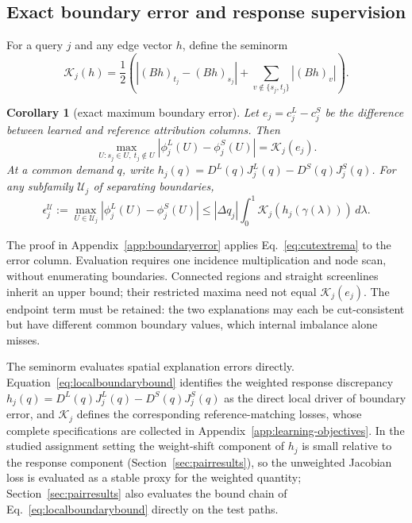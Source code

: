 \documentclass[a4paper,fleqn]{cas-sc}
\newtheorem{corollary}[theorem]{Corollary}
\begin{document}
\subsection{Exact boundary error and response supervision}\label{sec:boundarylearning}
For a query $j$ and any edge vector $h$, define the seminorm
\begin{equation}
\mathcal K_j(h)=\frac12\left(\left|(Bh)_{t_j}-(Bh)_{s_j}\right|
+\sum_{v\notin\{s_j,t_j\}}|(Bh)_v|\right).
\label{eq:boundaryseminorm}
\end{equation}
\begin{corollary}[exact maximum boundary error]\label{cor:boundaryerror}
Let $e_j=c^L_j-c^S_j$ be the difference
between learned and reference attribution columns. Then
\begin{equation}
\max_{U:s_j\in U,\ t_j\notin U}|\phi_j^L(U)-\phi_j^S(U)|
=\mathcal K_j(e_j).\label{eq:exactboundaryerror}
\end{equation}
At a common demand $q$, write
$h_j(q)=D^L(q)J_j^L(q)-D^S(q)J_j^S(q)$.
For any subfamily $\mathcal U_j$ of separating boundaries,
\begin{equation}
\epsilon_j^{\mathcal U}:=\max_{U\in\mathcal U_j}|\phi_j^L(U)-\phi_j^S(U)|
\le |\Delta q_j|\int_0^1\mathcal K_j(h_j(\gamma(\lambda)))\,d\lambda.
\label{eq:localboundarybound}
\end{equation}
\end{corollary}
The proof in Appendix~\ref{app:boundaryerror} applies
Eq.~\eqref{eq:cutextrema} to the error column. Evaluation requires one
incidence multiplication and node scan, without enumerating boundaries.
Connected regions and straight screenlines inherit an upper bound; their
restricted maxima need not equal $\mathcal K_j(e_j)$. The endpoint term
must be retained: the two explanations may each be cut-consistent but
have different common boundary values, which internal imbalance alone misses.

The seminorm evaluates spatial explanation errors directly.
Equation~\eqref{eq:localboundarybound} identifies the weighted response
discrepancy $h_j(q)=D^L(q)J_j^L(q)-D^S(q)J_j^S(q)$ as the direct local
driver of boundary error, and $\mathcal K_j$ defines the corresponding
reference-matching losses, whose complete specifications are collected
in Appendix~\ref{app:learning-objectives}. In the studied assignment
setting the weight-shift component of $h_j$ is small relative to the
response component (Section~\ref{sec:pairresults}), so the unweighted
Jacobian loss is evaluated as a stable proxy for the weighted quantity;
Section~\ref{sec:pairresults} also evaluates the bound chain of
Eq.~\eqref{eq:localboundarybound} directly on the test paths.
\end{document}
